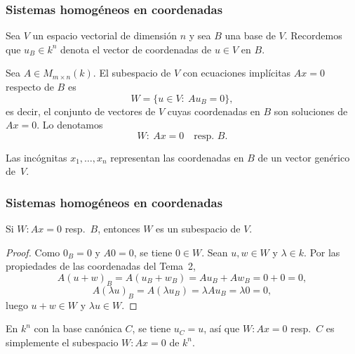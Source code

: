 \begin{frame}
    \frametitle{Sistemas homogéneos en coordenadas}

    Sea $V$ un espacio vectorial de dimensión $n$ y sea $B$ una base de $V$.
    Recordemos que $u_B\in k^n$ denota el vector de coordenadas de $u\in V$
    en $B$.

    \begin{definition}
        Sea $A\in M_{m\times n}(k)$. El subespacio de $V$
        con \alert{ecuaciones implícitas $Ax=0$ respecto de $B$} es
        \[
            W=\{u\in V:\ Au_B=0\},
        \]
        es decir, el conjunto de vectores de $V$ cuyas coordenadas en $B$
        son soluciones de $Ax=0$. Lo denotamos
        \[
            W\colon\ Ax=0\quad\text{resp.\ }B.
        \]
    \end{definition}

    \medskip

    Las incógnitas $x_1,\ldots,x_n$ representan las \alert{coordenadas}
    en $B$ de un vector genérico de~$V$.
\end{frame}

\begin{frame}
    \frametitle{Sistemas homogéneos en coordenadas}

    \begin{proposition}
        Si $W\colon Ax=0$ resp.\ $B$, entonces $W$ es un subespacio de $V$.
    \end{proposition}

    \begin{proof}
        Como $0_B=0$ y $A0=0$, se tiene $0\in W$. Sean $u,w\in W$ y
        $\lambda\in k$. Por las propiedades de las coordenadas del Tema~2,
        \[
            A(u+w)_B=A(u_B+w_B)=Au_B+Aw_B=0+0=0,
        \]
        \[
            A(\lambda u)_B=A(\lambda u_B)=\lambda Au_B=\lambda0=0,
        \]
        luego $u+w\in W$ y $\lambda u\in W$.
    \end{proof}

    \medskip

    En $k^n$ con la base canónica $C$, se tiene $u_C=u$, así que
    $W\colon Ax=0$ resp.\ $C$ es simplemente el subespacio $W\colon Ax=0$
    de $k^n$.
\end{frame}


